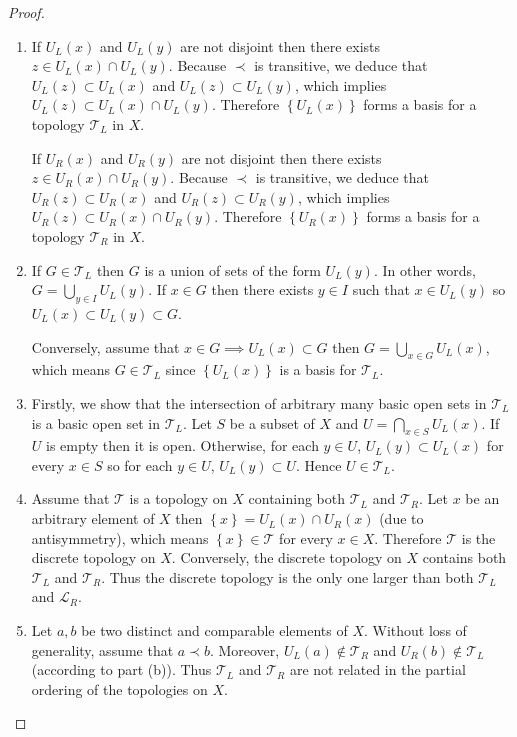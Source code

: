 \begin{proof}
    \begin{enumerate}[label={(\alph*)}]
        \item If \( U_{L}(x) \) and \( U_{L}(y) \) are not disjoint then there exists \( z \in U_{L}(x) \cap U_{L}(y) \). Because \( \prec \) is transitive, we deduce that \( U_{L}(z) \subset U_{L}(x) \) and \( U_{L}(z) \subset U_{L}(y) \), which implies \( U_{L}(z) \subset U_{L}(x) \cap U_{L}(y) \). Therefore \( \left\{ U_{L}(x) \right\} \) forms a basis for a topology \( \mathscr{T}_{L} \) in \( X \).

              If \( U_{R}(x) \) and \( U_{R}(y) \) are not disjoint then there exists \( z \in U_{R}(x) \cap U_{R}(y) \). Because \( \prec \) is transitive, we deduce that \( U_{R}(z) \subset U_{R}(x) \) and \( U_{R}(z) \subset U_{R}(y) \), which implies \( U_{R}(z) \subset U_{R}(x) \cap U_{R}(y) \). Therefore \( \left\{ U_{R}(x) \right\} \) forms a basis for a topology \( \mathscr{T}_{R} \) in \( X \).
        \item If \( G \in \mathscr{T}_{L} \) then \( G \) is a union of sets of the form \( U_{L}(y) \). In other words, \( G = \bigcup_{y \in I} U_{L}(y) \). If \( x \in G \) then there exists \( y \in I \) such that \( x \in U_{L}(y) \) so \( U_{L}(x) \subset U_{L}(y) \subset G \).

              Conversely, assume that \( x \in G \implies U_{L}(x) \subset G \) then \( G = \bigcup_{x\in G} U_{L}(x) \), which means \( G \in \mathscr{T}_{L} \) since \( \left\{ U_{L}(x) \right\} \) is a basis for \( \mathscr{T}_{L} \).
        \item Firstly, we show that the intersection of arbitrary many basic open sets in \( \mathscr{T}_{L} \) is a basic open set in \( \mathscr{T}_{L} \). Let \( S \) be a subset of \( X \) and \( U = \bigcap_{x\in S} U_{L}(x) \). If \( U \) is empty then it is open. Otherwise, for each \( y \in U \), \( U_{L}(y) \subset U_{L}(x) \) for every \( x \in S \) so for each \( y \in U \), \( U_{L}(y) \subset U \). Hence \( U \in \mathscr{T}_{L} \).
        \item Assume that \( \mathscr{T} \) is a topology on \( X \) containing both \( \mathscr{T}_{L} \) and \( \mathscr{T}_{R} \). Let \( x \) be an arbitrary element of \( X \) then \( \left\{ x \right\} = U_{L}(x) \cap U_{R}(x) \) (due to antisymmetry), which means \( \left\{ x \right\} \in \mathscr{T} \) for every \( x \in X \). Therefore \( \mathscr{T} \) is the discrete topology on \( X \). Conversely, the discrete topology on \( X \) contains both \( \mathscr{T}_{L} \) and \( \mathscr{T}_{R} \). Thus the discrete topology is the only one larger than both \( \mathscr{T}_{L} \) and \( \mathscr{L}_{R} \).
        \item Let \( a, b \) be two distinct and comparable elements of \( X \). Without loss of generality, assume that \( a \prec b \). Moreover, \( U_{L}(a) \notin \mathscr{T}_{R} \) and \( U_{R}(b) \notin \mathscr{T}_{L} \) (according to part (b)). Thus \(\mathscr{T}_{L}\) and \(\mathscr{T}_{R}\) are not related in the partial ordering of the topologies on \(X\).
    \end{enumerate}
\end{proof}

